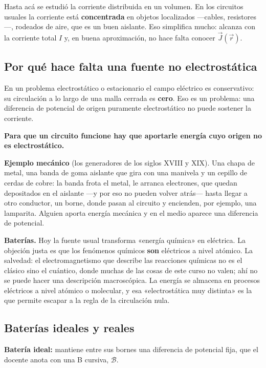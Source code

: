 \documentclass[12pt,a4paper]{article}
\begin{document}
Hasta acá se estudió la corriente distribuida en un volumen. En los circuitos
usuales la corriente está \textbf{concentrada} en objetos localizados ---cables,
resistores---, rodeados de aire, que es un buen aislante. Eso simplifica mucho:
alcanza con la corriente total $I$ y, en buena aproximación, no hace falta
conocer $\vec J(\vec r)$.

\subsection{Por qué hace falta una fuente no electrostática}

En un problema electrostático o estacionario el campo eléctrico es
conservativo: su circulación a lo largo de una malla cerrada es \textbf{cero}. Eso
es un problema: una diferencia de potencial de origen puramente electrostático
no puede sostener la corriente.

\begin{notebox}
\textbf{Para que un circuito funcione hay que aportarle energía cuyo origen no es
electrostático.}
\end{notebox}

\textbf{Ejemplo mecánico} (los generadores de los siglos XVIII y XIX). Una chapa de
metal, una banda de goma aislante que gira con una manivela y un cepillo de
cerdas de cobre: la banda frota el metal, le arranca electrones, que quedan
depositados en el aislante ---y por eso no pueden volver atrás--- hasta llegar a
otro conductor, un borne, donde pasan al circuito y encienden, por ejemplo, una
lamparita. Alguien aporta energía mecánica y en el medio aparece una diferencia
de potencial.

\textbf{Baterías.} Hoy la fuente usual transforma «energía química» en eléctrica. La
objeción justa es que los fenómenos químicos \textbf{son} eléctricos a nivel atómico.
La salvedad: el electromagnetismo que describe las reacciones químicas no es el
clásico sino el cuántico, donde muchas de las cosas de este curso no valen; ahí
no se puede hacer una descripción macroscópica. La energía se almacena en
procesos eléctricos a nivel atómico o molecular, y esa «electrostática muy
distinta» es la que permite escapar a la regla de la circulación nula.

\subsection{Baterías ideales y reales}

\textbf{Batería ideal:} mantiene entre sus bornes una diferencia de potencial fija,
que el docente anota con una B cursiva, $\mathcal{B}$.
\end{document}
